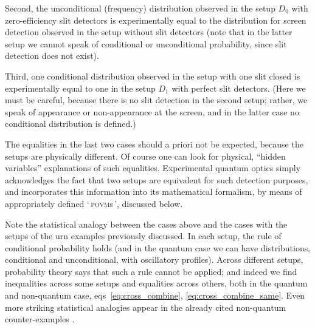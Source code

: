 \documentclass[\ifafour a4paper,12pt,\else a5paper,10pt,\fi%
onecolumn,oneside,article,%
british%
]{memoir}
\newcommand*{\defquote}[1]{`\,#1\,'}
\theoremstyle{remark}
\theoremstyle{innote}
\newcommand*{\citep}{\parencites}%
\renewcommand*{\|}[1][]{\nonscript\,#1\vert\nonscript\;\mathopen{}}
\newcommand*{\sect}{\S}%
\newcommand*{\eqns}{eqs}%
\newcommand*{\povm}{\textsc{povm}}
\begin{document}
Second, the unconditional (frequency) distribution observed in the setup
$D_{0}$ with zero-efficiency slit detectors is experimentally equal to the
distribution for screen detection observed in the setup without slit
detectors (note that in the latter setup we cannot speak of conditional or
unconditional probability, since slit detection does not exist).

Third, one conditional distribution observed in the setup with one slit
closed is experimentally equal to one in the setup $D_{1}$ with perfect
slit detectors. (Here we must be careful, because there is no slit
detection in the second setup; rather, we speak of appearance or
non-appearance at the screen, and in the latter case no conditional
distribution is defined.)

The equalities in the last two cases should a priori not be expected,
because the setups are physically different. Of course one can look for
physical, \enquote{hidden variables} explanations of such equalities.
Experimental quantum optics simply acknowledges the fact that two setups
are equivalent for such detection purposes, and incorporates this
information into its mathematical formalism, by means of appropriately
defined \defquote{\povm s}, discussed below.

\medskip

Note the statistical analogy between the cases above and the cases with the
setups of the urn examples previously discussed. In each setup, the rule of
conditional probability holds (and in the quantum case we can have
distributions, conditional and unconditional, with oscillatory profiles).
Across different setups, probability theory says that such a rule cannot be
applied; and indeed we find inequalities across some setups and equalities
across others, both in the quantum and non-quantum case,
\eqns~\eqref{eq:cross_combine}, \eqref{eq:cross_combine_same}. Even more
striking statistical analogies appear in the already cited non-quantum
counter-examples
\citep{kirkpatrick2001_r2003,kirkpatrick2002_r2003}[\sect~IV]{portamana2003_r2004}.

\medskip
\end{document}
